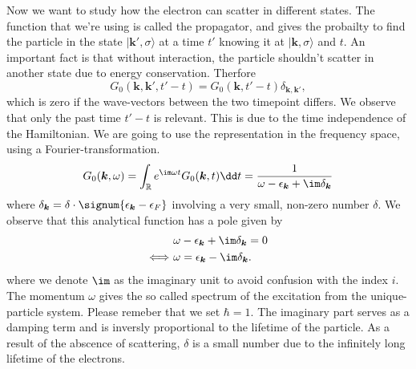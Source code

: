 \documentclass[../main.tex]{subfile}
\begin{document}
Now we want to study how the electron can scatter in different states. The function that we're using is called the propagator, and
gives the probailty to find the particle in the state $|\bm{k}',\sigma\rangle$ at a time $t'$ knowing it at $|\bm{k},\sigma\rangle$ and $t$. 
An important fact is that without interaction, the particle shouldn't scatter in another state due to energy conservation. Therfore
\[
    G_0(\bm{k}, \bm{k}', t'-t) = G_0(\bm{k}, t'-t) \delta_{\bm{k}, \bm{k}'},
\]
which is zero if the wave-vectors between the two timepoint differs. 
We observe that only the past time $t'-t$ is relevant. This is due to the time independence of the Hamiltonian.
We are going to use the representation in the frequency space, using a Fourier-transformation.
\begin{equation}
    G_0(\bm{k},\omega) = \int_{\mathbb{R}} e^{\im\omega t} G_0(\bm{k},t)\dd t = \frac{1}{\omega - \epsilon_{\bm{k}} + \im \delta_{\bm{k}}} \label{eq:single_propa}
\end{equation}
where $\delta_{\bm{k}} = \delta \cdot\signum{\epsilon_{\bm{k}} - \epsilon_{F}}$ involving a very small, non-zero number $\delta$. We observe that
this analytical function has a pole given by 
\begin{align*}
    &\omega - \epsilon_{\bm{k}} + \im \delta_{\bm{k}} = 0\\
    \Longleftrightarrow ~& \omega = \epsilon_{\bm{k}} - \im \delta_{\bm{k}}.
\end{align*}
where we denote $\im$ as the imaginary unit to avoid confusion with the index $i$.
The momentum $\omega$ gives the so called spectrum of the excitation from the unique-particle system. Please remeber that we set $\hbar =1$. The imaginary part serves as a damping term and is 
inversly proportional to the lifetime of the particle. As a result of the abscence of scattering, $\delta$ is a small number due to the infinitely long lifetime of the electrons.\\
\end{document}

